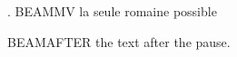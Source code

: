 

\begin{frame}
\ex. BEAMMV la seule  romaine  possible

\pause
BEAMAFTER the text after the pause.
\end{frame}

